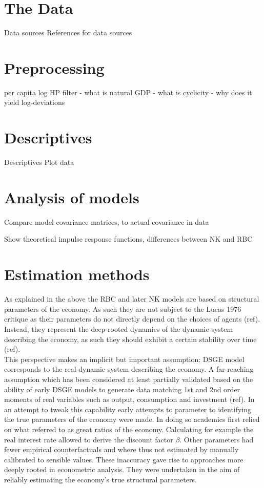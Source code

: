 \documentclass[11pt,a4paper,english]{article} %
\begin{document}
	\section{The Data}
	Data sources
	References for data sources
	
	\section{Preprocessing}
	per capita
	log
	HP filter
	- what is natural GDP
	- what is cyclicity
	- why does it yield log-deviations
	
	
	\section{Descriptives}
	Descriptives
	Plot data
	
	\section{Analysis of models}
	Compare model covariance matrices, to actual covariance in data
	
	Show theoretical impulse response functions, differences between NK and RBC
	
	\section{Estimation methods}
		
	As explained in the above the RBC and later NK models are based on structural parameters of the economy. As such they are not subject to the Lucas 1976 critique as their parameters do not  directly depend on the choices of agents (ref). Instead, they represent the deep-rooted dynamics of the dynamic system describing the economy, as such they should exhibit a certain stability over time (ref). \\
	
	This perspective makes an implicit but important assumption: DSGE model corresponds to the real dynamic system describing the economy. A far reaching assumption which has been considered at least partially validated based on the ability of early DSGE models to generate data matching 1st and 2nd order moments of real variables such as output, consumption and investment (ref). 
	In an attempt to tweak this capability  early attempts to parameter to identifying the true parameters of the economy were made. In doing so academics first relied on what \cite{prescott_theory_1986} referred to as great ratios of the economy. Calculating for example the real interest rate allowed to derive the discount factor $\beta$. 
	Other parameters had fewer empirical counterfactuals and where thus not estimated by manually calibrated to sensible values. These inaccuracy gave rise to approaches more deeply rooted in econometric analysis. They were undertaken in the aim of reliably estimating the economy's true structural parameters.\\
	
\end{document}
